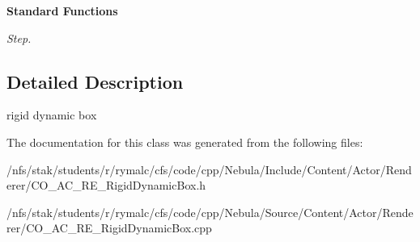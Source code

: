 \begin{Indent}{\bf Standard Functions}
\begin{DoxyCompactItemize}
\begin{DoxyCompactList}\small\item\em Step. \item\end{DoxyCompactList}\end{DoxyCompactItemize}
\end{Indent}


\subsection{Detailed Description}
rigid dynamic box 

The documentation for this class was generated from the following files:\begin{DoxyCompactItemize}
\item 
/nfs/stak/students/r/rymalc/cfs/code/cpp/Nebula/Include/Content/Actor/Renderer/CO\_\-AC\_\-RE\_\-RigidDynamicBox.h\item 
/nfs/stak/students/r/rymalc/cfs/code/cpp/Nebula/Source/Content/Actor/Renderer/CO\_\-AC\_\-RE\_\-RigidDynamicBox.cpp\end{DoxyCompactItemize}
